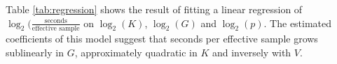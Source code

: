 {%
% 
% 
% 


Table \ref{tab:regression} shows the result of fitting a linear regression of $\log_2(\frac{\mbox{seconds}}{\mbox{effective sample}}$ on $\log_2(K)$, $\log_2(G)$ and $\log_2(p)$. The estimated coefficients of this model suggest that seconds per effective sample grows sublinearly in $G$, approximately quadratic in $K$ and inversely with $V$.

}
